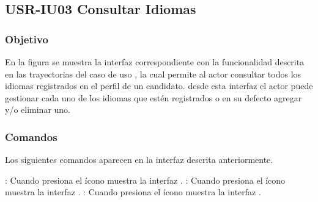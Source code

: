 \clearpage
\subsection{USR-IU03 Consultar Idiomas}

\subsubsection{Objetivo}
En la figura  se muestra la interfaz correspondiente con la funcionalidad descrita en las
trayectorias del caso de uso , la cual permite al actor consultar todos los idiomas registrados en el perfil de un candidato.
desde esta interfaz el actor puede gestionar cada uno de los idiomas que estén registrados o en su defecto agregar y/o eliminar uno.

\subsubsection{Comandos}
Los siguientes comandos aparecen en la interfaz descrita anteriormente.

\Titem \IUAgregar{} : Cuando presiona el ícono muestra la interfaz .
\Titem \IUEditar{} : Cuando presiona el ícono muestra la interfaz .
\Titem \IUEliminar{} : Cuando presiona el ícono muestra la interfaz .

\clearpage
